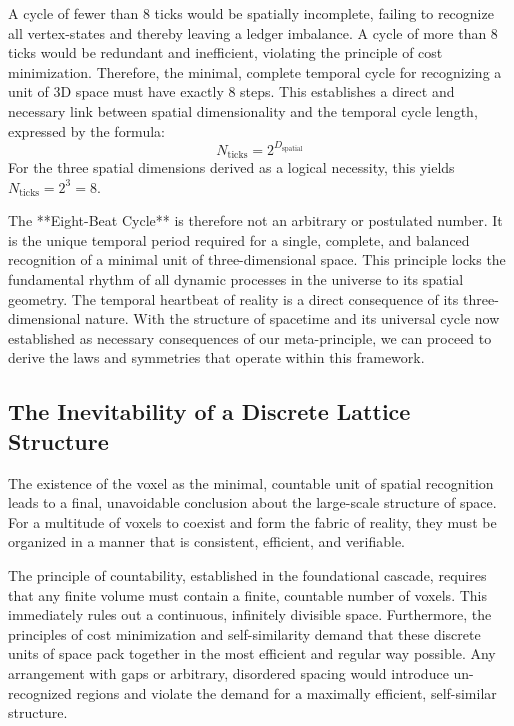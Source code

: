 \documentclass[11pt,a4paper]{article}
\begin{document}
A cycle of fewer than 8 ticks would be spatially incomplete, failing to recognize all vertex-states and thereby leaving a ledger imbalance. A cycle of more than 8 ticks would be redundant and inefficient, violating the principle of cost minimization. Therefore, the minimal, complete temporal cycle for recognizing a unit of 3D space must have exactly 8 steps. This establishes a direct and necessary link between spatial dimensionality and the temporal cycle length, expressed by the formula:
\begin{equation}
N_{\text{ticks}} = 2^{D_{\text{spatial}}}
\end{equation}
For the three spatial dimensions derived as a logical necessity, this yields \(N_{\text{ticks}} = 2^3 = 8\).

The **Eight-Beat Cycle** is therefore not an arbitrary or postulated number. It is the unique temporal period required for a single, complete, and balanced recognition of a minimal unit of three-dimensional space. This principle locks the fundamental rhythm of all dynamic processes in the universe to its spatial geometry. The temporal heartbeat of reality is a direct consequence of its three-dimensional nature. With the structure of spacetime and its universal cycle now established as necessary consequences of our meta-principle, we can proceed to derive the laws and symmetries that operate within this framework.

\subsection{The Inevitability of a Discrete Lattice Structure}
The existence of the voxel as the minimal, countable unit of spatial recognition leads to a final, unavoidable conclusion about the large-scale structure of space. For a multitude of voxels to coexist and form the fabric of reality, they must be organized in a manner that is consistent, efficient, and verifiable.

The principle of countability, established in the foundational cascade, requires that any finite volume must contain a finite, countable number of voxels. This immediately rules out a continuous, infinitely divisible space. Furthermore, the principles of cost minimization and self-similarity demand that these discrete units of space pack together in the most efficient and regular way possible. Any arrangement with gaps or arbitrary, disordered spacing would introduce un-recognized regions and violate the demand for a maximally efficient, self-similar structure.
\end{document}
